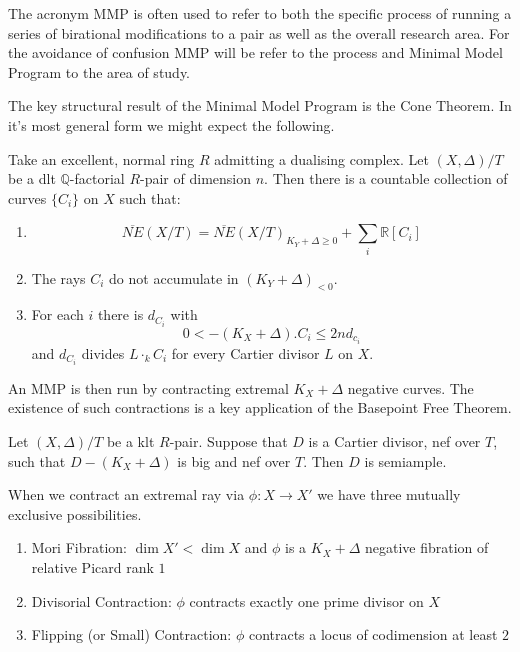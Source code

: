 The acronym MMP is often used to refer to both the specific process of running a series of birational modifications to a pair as well as the overall research area. For the avoidance of confusion MMP will be refer to the process and Minimal Model Program to the area of study.

The key structural result of the Minimal Model Program is the Cone Theorem. In it's most general form we might expect the following.

\begin{conjecture}\label{cone-conj}
	Take an excellent, normal ring $R$ admitting a dualising complex.
	Let $(X,\Delta)/T$ be a dlt $\mathbb{Q}$-factorial $R$-pair of dimension $n$. Then there is a countable collection of curves $\{C_{i}\}$ on $X$ such that:
	\begin{enumerate}
		\item $$\overline{NE}(X/T)=\overline{NE}(X/T)_{K_{Y}+\Delta \geq 0} + \sum_{i} \mathbb{R}[C_{i}]$$
		\item The rays $C_{i}$ do not accumulate in $(K_{Y}+\Delta)_{<0}$.
		\item For each $i$ there is $d_{C_{i}}$ with 
		\[0 < -(K_{X}+\Delta).C_{i} \leq 2nd_{c_{i}}\]
		and $d_{C_{i}}$ divides $L\cdot_{k}C_{i}$ for every Cartier divisor $L$ on $X$.
	\end{enumerate}
\end{conjecture}

An MMP is then run by contracting extremal $K_{X}+\Delta$ negative curves. The existence of such contractions is a key application of the Basepoint Free Theorem.

\begin{conjecture}\label{bpt-conj}
	Let $(X,\Delta)/T$ be a klt $R$-pair. Suppose that $D$ is a Cartier divisor, nef over $T$, such that $D-(K_{X}+\Delta)$ is big and nef over $T$. Then $D$ is semiample.
\end{conjecture}

When we contract an extremal ray via $\phi:X \to X'$ we have three mutually exclusive possibilities.

\begin{enumerate}
	\item Mori Fibration: $\dim X' < \dim X$ and $\phi$ is a $K_{X}+\Delta$ negative fibration of relative Picard rank $1$
	\item Divisorial Contraction: $\phi$ contracts exactly one prime divisor on $X$
	\item Flipping (or Small) Contraction: $\phi$ contracts a locus of codimension at least $2$
\end{enumerate}

